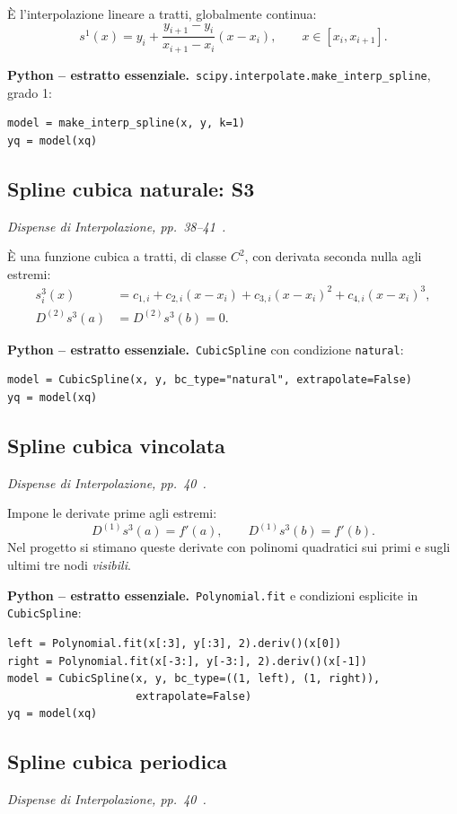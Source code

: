 \documentclass[11pt,a4paper]{article}
\newcommand{\slides}[1]{\textit{Dispense di Interpolazione, pp.~#1~\cite{dispense}.}}
\newcommand{\python}{\textbf{Python -- estratto essenziale.}}
\numberwithin{equation}{section}
\begin{document}
È l'interpolazione lineare a tratti, globalmente continua:
\begin{equation}
 s^1(x)=y_i+\frac{y_{i+1}-y_i}{x_{i+1}-x_i}(x-x_i),
 \qquad x\in[x_i,x_{i+1}].
\end{equation}

\python\ \texttt{scipy.interpolate.make\_interp\_spline}, grado 1:
\begin{lstlisting}
model = make_interp_spline(x, y, k=1)
yq = model(xq)
\end{lstlisting}

\subsection{Spline cubica naturale: S3}
\slides{38--41}

È una funzione cubica a tratti, di classe $C^2$, con derivata seconda
nulla agli estremi:
\begin{align}
 s^3_i(x)&=c_{1,i}+c_{2,i}(x-x_i)+c_{3,i}(x-x_i)^2+c_{4,i}(x-x_i)^3,\\
 D^{(2)}s^3(a)&=D^{(2)}s^3(b)=0.
\end{align}

\python\ \texttt{CubicSpline} con condizione \texttt{natural}:
\begin{lstlisting}
model = CubicSpline(x, y, bc_type="natural", extrapolate=False)
yq = model(xq)
\end{lstlisting}

\subsection{Spline cubica vincolata}
\slides{40}

Impone le derivate prime agli estremi:
\begin{equation}
 D^{(1)}s^3(a)=f'(a),\qquad D^{(1)}s^3(b)=f'(b).
\end{equation}
Nel progetto si stimano queste derivate con polinomi quadratici sui
primi e sugli ultimi tre nodi \emph{visibili}.

\python\ \texttt{Polynomial.fit} e condizioni esplicite in
\texttt{CubicSpline}:
\begin{lstlisting}
left = Polynomial.fit(x[:3], y[:3], 2).deriv()(x[0])
right = Polynomial.fit(x[-3:], y[-3:], 2).deriv()(x[-1])
model = CubicSpline(x, y, bc_type=((1, left), (1, right)),
                    extrapolate=False)
yq = model(xq)
\end{lstlisting}

\subsection{Spline cubica periodica}
\slides{40}
\end{document}
